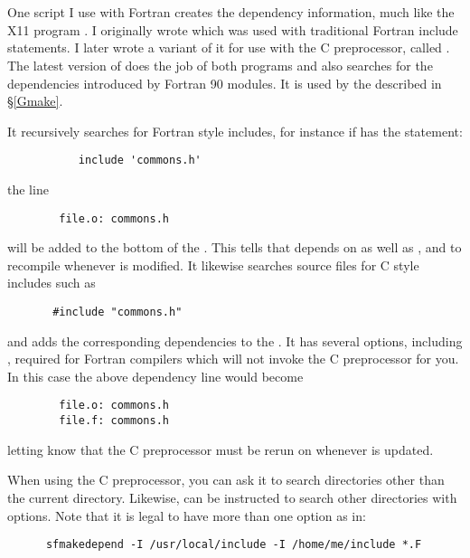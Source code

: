 \section{}
\label{sfm}
One  script I use with Fortran creates the
dependency information, much like the X11
program .  I originally wrote  which
was used with traditional Fortran include statements.
I later wrote a variant of it for use with the C preprocessor,
called .  The latest version of
 does the job of both programs and also searches for
the dependencies introduced by Fortran 90 modules.  It is used by the
 described in \S\ref{Gmake}.

It recursively searches for Fortran
style includes, for instance if  has the statement:
\begin{verbatim}
           include 'commons.h'
\end{verbatim}
the line
\begin{verbatim}
        file.o: commons.h
\end{verbatim}
will be added to the bottom of the .  This tells
 that  depends on  as well
as , and to recompile  whenever
 is modified.
It likewise searches source files for C style includes such as
\begin{verbatim}
       #include "commons.h"
\end{verbatim}
and adds the corresponding dependencies to the .
It has several options, including , required for Fortran
compilers which will not invoke the C preprocessor for you.  In this
case the above dependency line would become
\begin{verbatim}
        file.o: commons.h
        file.f: commons.h
\end{verbatim}
letting  know that the C preprocessor must be rerun on
 whenever  is updated.

When using the C preprocessor, you can ask it to search directories
other than the current directory.  Likewise,  can be
instructed to search other directories with  options.
Note that it is legal to have more than one  option as in:
\begin{verbatim}
      sfmakedepend -I /usr/local/include -I /home/me/include *.F
\end{verbatim}

